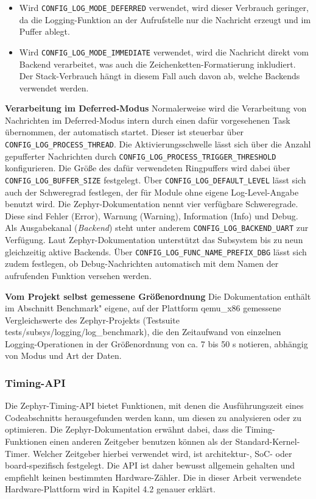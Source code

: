 \begin{itemize}
\item Wird \lstinline[style=codeinline]|CONFIG_LOG_MODE_DEFERRED| verwendet, wird dieser Verbrauch geringer, da die Logging-Funktion an der Aufrufstelle nur die Nachricht erzeugt und im Puffer ablegt.
\item Wird \lstinline[style=codeinline]|CONFIG_LOG_MODE_IMMEDIATE| verwendet, wird die Nachricht direkt vom Backend verarbeitet, was auch die Zeichenketten-Formatierung inkludiert. Der Stack-Verbrauch h{\"a}ngt in diesem Fall auch davon ab, welche Backends verwendet werden.
\end{itemize}
\textbf{Verarbeitung im Deferred-Modus} Normalerweise wird die Verarbeitung von Nachrichten im Deferred-Modus intern durch einen daf{\"u}r vorgesehenen Task {\"u}bernommen, der automatisch startet. Dieser ist steuerbar {\"u}ber \lstinline[style=codeinline]|CONFIG_LOG_PROCESS_THREAD|. Die Aktivierungsschwelle l{\"a}sst sich {\"u}ber die Anzahl gepufferter Nachrichten durch \lstinline[style=codeinline]|CONFIG_LOG_PROCESS_TRIGGER_THRESHOLD| konfigurieren. Die Gr{\"o}{\ss}e des daf{\"u}r verwendeten Ringpuffers wird dabei {\"u}ber \lstinline[style=codeinline]|CONFIG_LOG_BUFFER_SIZE| festgelegt. {\"U}ber \lstinline[style=codeinline]|CONFIG_LOG_DEFAULT_LEVEL| l{\"a}sst sich auch der Schweregrad festlegen, der f{\"u}r Module ohne eigene Log-Level-Angabe benutzt wird. Die Zephyr-Dokumentation nennt vier verf{\"u}gbare Schweregrade. Diese sind Fehler (Error), Warnung (Warning), Information (Info) und Debug. Als Ausgabekanal (\emph{Backend}) steht unter anderem \lstinline[style=codeinline]|CONFIG_LOG_BACKEND_UART| zur Verf{\"u}gung. Laut Zephyr-Dokumentation unterst{\"u}tzt das Subsystem bis zu neun gleichzeitig aktive Backends. {\"U}ber \lstinline[style=codeinline]|CONFIG_LOG_FUNC_NAME_PREFIX_DBG| l{\"a}sst sich zudem festlegen, ob Debug-Nachrichten automatisch mit dem Namen der aufrufenden Funktion versehen werden.

\textbf{Vom Projekt selbst gemessene Gr{\"o}{\ss}enordnung} Die Dokumentation enth{\"a}lt im Abschnitt \glqq{}Benchmark" eigene, auf der Plattform qemu\_x86 gemessene Vergleichswerte des Zephyr-Projekts (Testsuite tests/subsys/logging/log\_benchmark), die den Zeitaufwand von einzelnen Logging-Operationen in der Gr{\"o}{\ss}enordnung von ca. 7 bis 50 \textmu{}s notieren, abh{\"a}ngig von Modus und Art der Daten.

\subsubsection{Timing-API}
Die Zephyr-Timing-API bietet Funktionen, mit denen die Ausf{\"u}hrungszeit eines Codeabschnitts herausgefunden werden kann, um diesen zu analysieren oder zu optimieren. Die Zephyr-Dokumentation erw{\"a}hnt dabei, dass die Timing-Funktionen einen anderen Zeitgeber benutzen k{\"o}nnen als der Standard-Kernel-Timer. Welcher Zeitgeber hierbei verwendet wird, ist architektur-, SoC- oder board-spezifisch festgelegt. Die API ist daher bewusst allgemein gehalten und empfiehlt keinen bestimmten Hardware-Z{\"a}hler. Die in dieser Arbeit verwendete Hardware-Plattform wird in Kapitel 4.2 genauer erkl{\"a}rt.

